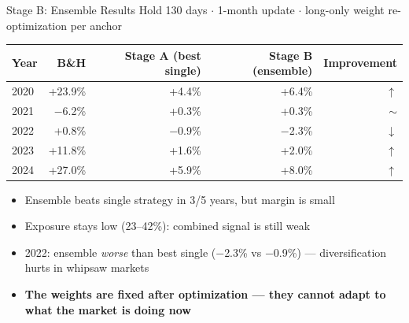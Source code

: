 \documentclass[aspectratio=169]{beamer}
\begin{document}
\begin{frame}{Stage B: Ensemble Results}
  \small
  Hold 130 days $\cdot$ 1-month update $\cdot$ long-only weight re-optimization per anchor

  \vspace{0.5em}
  \begin{tabular}{lrrrr}
    \toprule
    Year & B\&H & Stage A (best single) & Stage B (ensemble) & Improvement \\
    \midrule
    2020 & +23.9\% & +4.4\% & +6.4\% & $\uparrow$ \\
    2021 & $-$6.2\%  & +0.3\% & +0.3\% & $\sim$ \\
    2022 & +0.8\%  & $-$0.9\% & $-$2.3\% & $\downarrow$ \\
    2023 & +11.8\% & +1.6\% & +2.0\% & $\uparrow$ \\
    2024 & +27.0\% & +5.9\% & +8.0\% & $\uparrow$ \\
    \bottomrule
  \end{tabular}

  \vspace{0.6em}
  \begin{itemize}
    \item Ensemble beats single strategy in 3/5 years, but margin is small
    \item Exposure stays low (23--42\%): combined signal is still weak
    \item 2022: ensemble \emph{worse} than best single ($-$2.3\% vs $-$0.9\%) --- diversification hurts in whipsaw markets
    \item \textbf{The weights are fixed after optimization --- they cannot adapt to what the market is doing now}
  \end{itemize}
\end{frame}
\end{document}
